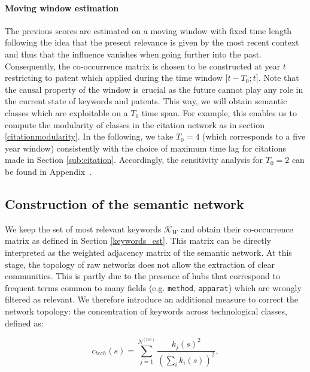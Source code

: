 \documentclass[10pt,A4,draft]{article}
\begin{document}
\paragraph{Moving window estimation}
The previous scores are estimated on a moving window with fixed time length following the idea that the present relevance is given by the most recent context and thus that the influence vanishes when going further into the past. Consequently, the co-occurrence matrix is chosen to be constructed at year $t$ restricting to patent which applied during the time window $\big[ t - T_0 ; t \big]$. Note that the causal property of the window is crucial as the future cannot play any role in the current state of keywords and patents. This way, we will obtain semantic classes which are exploitable on a $T_0$ time span. For example, this enables us to compute the modularity of classes in the citation network as in section \ref{citationmodularity}. In the following, we take $T_0 = 4$ (which corresponds to a five year window) consistently with the choice of maximum time lag for citations made in Section \ref{sub:citation}. Accordingly, the sensitivity analysis for $T_0=2$ can be found in Appendix~.

\subsection{Construction of the semantic network}
\label{construction}

We keep the set of most relevant keywords $\mathcal{K}_W$ and obtain their co-occurrence matrix as defined in Section \ref{keywords_est}. This matrix can be directly interpreted as the weighted adjacency matrix of the semantic network. At this stage, the topology of raw networks does not allow the extraction of clear communities. This is partly due to the presence of hubs that correspond to frequent terms common to many fields (e.g. \texttt{method}, \texttt{apparat}) which are wrongly filtered as relevant. We therefore introduce an additional measure to correct the network topology: the concentration of keywords across technological classes, defined as: 

$$c_{tech}(s) = \displaystyle \sum_{j=1}^{N^{(tec)}} \frac{k_j(s)^2}{ \left(\sum_i k_i(s)\right)^2},$$  
\end{document}

